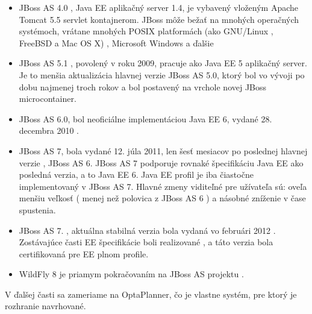 \begin{itemize}
\item JBoss AS 4.0 , Java EE aplikačný server 1.4, je vybavený vloženým Apache Tomcat 5.5 servlet kontajnerom. JBoss môže bežať na mnohých operačných systémoch, vrátane mnohých POSIX platformách (ako GNU/Linux , FreeBSD a Mac OS X) , Microsoft Windows a ďalšie
\item JBoss AS 5.1 , povolený v roku 2009, pracuje ako Java EE 5 aplikačný server. Je to menšia aktualizácia hlavnej verzie JBoss AS 5.0, ktorý bol vo vývoji po dobu najmenej troch rokov a bol postavený na vrchole novej JBoss microcontainer.

\item JBoss AS 6.0, bol neoficiálne implementáciou Java EE 6, vydané 28. decembra 2010 .

\item JBoss AS 7, bola vydané 12. júla 2011, len šesť mesiacov po poslednej hlavnej verzie , JBoss AS 6. JBoss AS 7 podporuje rovnaké špecifikáciu Java EE ako posledná verzia, a to Java EE 6. Java EE profil je iba čiastočne implementovaný v JBoss AS 7. Hlavné zmeny viditeľné pre užívateľa sú: oveľa menšiu veľkosť ( menej než polovica z JBoss AS 6 ) a násobné zníženie v čase spustenia.

\item JBoss AS 7. , aktuálna stabilná verzia bola vydaná vo februári 2012 . Zostávajúce časti EE špecifikácie boli realizované , a táto verzia bola certifikovaná pre EE plnom profile.

\item WildFly 8 je priamym pokračovaním na JBoss AS projektu .

\end{itemize}

V ďalšej časti sa zameriame na OptaPlanner, čo je vlastne systém, pre ktorý je rozhranie navrhované.




